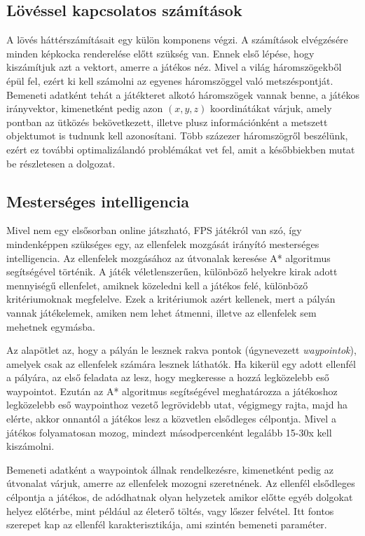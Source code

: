 \subsection{Lövéssel kapcsolatos számítások}

A lövés háttérszámításait egy külön komponens végzi. A számítások elvégzésére minden képkocka renderelése előtt szükség van. Ennek első lépése, hogy kiszámítjuk azt a vektort, amerre a játékos néz. Mivel a világ háromszögekből épül fel, ezért ki kell számolni az egyenes háromszöggel való metszéspontját. Bemeneti adatként tehát a játékteret alkotó háromszögek vannak benne, a játékos irányvektor, kimenetként pedig azon $(x, y, z)$ koordinátákat várjuk, amely pontban az ütközés bekövetkezett, illetve plusz információnként a metszett objektumot is tudnunk kell azonosítani. Több százezer háromszögről beszélünk, ezért ez további optimalizálandó problémákat vet fel, amit a későbbiekben mutat be részletesen a dolgozat.

\subsection{Mesterséges intelligencia}

Mivel nem egy elsősorban online játszható, FPS játékról van szó, így mindenképpen szükséges egy, az ellenfelek mozgását irányító mesterséges intelligencia. Az ellenfelek mozgásához az útvonalak keresése A* algoritmus segítségével történik. A játék véletlenszerűen, különböző helyekre kirak adott mennyiségű ellenfelet, amiknek közeledni kell a játékos felé, különböző kritériumoknak megfelelve. Ezek a kritériumok azért kellenek, mert a pályán vannak játékelemek, amiken nem lehet átmenni, illetve az ellenfelek sem mehetnek egymásba. 

Az alapötlet az, hogy a pályán le lesznek rakva pontok (úgynevezett \textit{waypointok}), amelyek csak az ellenfelek számára lesznek láthatók. Ha kikerül egy adott ellenfél a pályára, az első feladata az lesz, hogy megkeresse a hozzá legközelebb eső waypointot. Ezután az A* algoritmus segítségével meghatározza a játékoshoz legközelebb eső waypointhoz vezető legrövidebb utat, végigmegy rajta, majd ha elérte, akkor onnantól a játékos lesz a közvetlen elsődleges célpontja. Mivel a játékos folyamatosan mozog, mindezt másodpercenként legalább 15-30x kell kiszámolni.

Bemeneti adatként a waypointok állnak rendelkezésre, kimenetként pedig az útvonalat várjuk, amerre az ellenfelek mozogni szeretnének. Az ellenfél elsődleges célpontja a játékos, de adódhatnak olyan helyzetek amikor előtte egyéb dolgokat helyez előtérbe, mint például az életerő töltés, vagy lőszer felvétel. Itt fontos szerepet kap az ellenfél karakterisztikája, ami szintén bemeneti paraméter.

